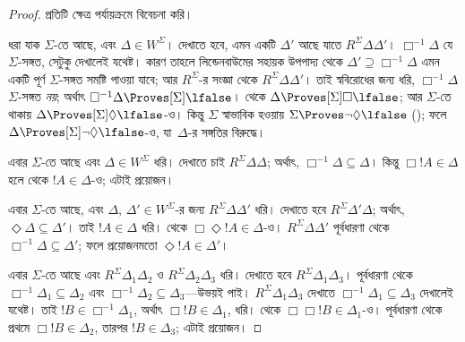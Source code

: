 \documentclass[../../../include/open-logic-section]{subfiles}
\begin{document}
\begin{proof}
  প্রতিটি ক্ষেত্র পর্যায়ক্রমে বিবেচনা করি।

  ধরা যাক $\Sigma$-তে  আছে, এবং $\Delta \in W^\Sigma$। দেখাতে হবে, এমন একটি $\Delta'$ আছে যাতে $R^\Sigma
  \Delta\Delta'$। $\Box^{-1}\Delta$ যে $\Sigma$-সঙ্গত, সেটুকু দেখালেই যথেষ্ট। কারণ তাহলে লিন্ডেনবাউমের সহায়ক উপপাদ্য থেকে $\Delta' \supseteq
  \Box^{-1}\Delta$ এমন একটি পূর্ণ $\Sigma$-সঙ্গত সমষ্টি পাওয়া যাবে; আর $R^\Sigma$-র সংজ্ঞা থেকে $R^\Sigma \Delta\Delta'$। তাই স্ববিরোধের জন্য ধরি, $\Box^{-1}\Delta$ $\Sigma$-সঙ্গত \emph{নয়}; অর্থাৎ $\Box^{-1}\Delta \Proves[\Sigma] \lfalse$।  থেকে $\Delta \Proves[\Sigma] \Box\lfalse$; আর $\Sigma$-তে  থাকায় $\Delta \Proves[\Sigma] \Diamond\lfalse$-ও। কিন্তু $\Sigma$ স্বাভাবিক হওয়ায় $\Sigma \Proves \lnot\Diamond \lfalse$ (); ফলে $\Delta
  \Proves[\Sigma] \lnot\Diamond \lfalse$-ও, যা~$\Delta$-র সঙ্গতির বিরুদ্ধে।

  এবার $\Sigma$-তে  আছে এবং $\Delta \in W^\Sigma$ ধরি। দেখাতে চাই $R^\Sigma \Delta\Delta$; অর্থাৎ, $\Box^{-1}\Delta \subseteq \Delta$। কিন্তু $\Box!A \in \Delta$ হলে  থেকে $!A \in \Delta$-ও; এটাই প্রয়োজন।

  এবার $\Sigma$-তে  আছে, এবং $\Delta$, $\Delta' \in W^\Sigma$-র জন্য $R^\Sigma
  \Delta\Delta'$ ধরি। দেখাতে হবে $R^\Sigma \Delta'\Delta$; অর্থাৎ,
  $\Diamond\Delta \subseteq \Delta'$। তাই $!A \in \Delta$ ধরি।  থেকে $\Box\Diamond!A \in \Delta$-ও। $R^\Sigma \Delta\Delta'$ পূর্বধারণা থেকে $\Box^{-1}\Delta
  \subseteq \Delta'$; ফলে প্রয়োজনমতো $\Diamond!A \in \Delta'$।

  এবার $\Sigma$-তে  আছে এবং $R^\Sigma
  \Delta_1\Delta_2$ ও $R^\Sigma \Delta_2\Delta_3$ ধরি। দেখাতে হবে $R^\Sigma \Delta_1\Delta_3$। পূর্বধারণা থেকে $\Box^{-1}\Delta_1
  \subseteq \Delta_2$ এবং $\Box^{-1}\Delta_2 \subseteq \Delta_3$—উভয়ই পাই। $R^\Sigma \Delta_1\Delta_3$ দেখাতে $\Box^{-1}\Delta_1 \subseteq \Delta_3$ দেখালেই যথেষ্ট। তাই $!B \in
  \Box^{-1}\Delta_1$, অর্থাৎ $\Box!B \in \Delta_1$, ধরি।  থেকে $\Box\Box!B \in \Delta_1$-ও। পূর্বধারণা থেকে প্রথমে $\Box!B \in \Delta_2$, তারপর $!B \in \Delta_3$; এটাই প্রয়োজন।


\end{proof}
\end{document}
